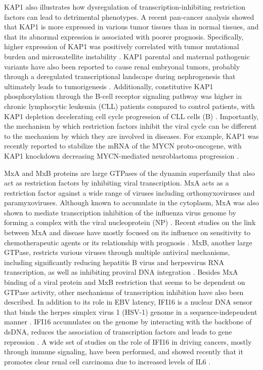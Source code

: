 \documentclass{enslyonreview}
\begin{document}
KAP1 also illustrates how dysregulation of transcription-inhibiting restriction factors can
lead to detrimental phenotypes. A recent pan-cancer analysis showed that KAP1 is more
expressed in various tumor tissues than in normal tissues, and that its abnormal expression is
associated with poorer prognosis. Specifically, higher expression of KAP1 was positively
correlated with tumor mutational burden and microsatellite instability \cite{shangSystematicPancancerAnalysis2023}. KAP1
parental and maternal pathogenic variants have also been reported to cause renal embryonal
tumors, probably through a deregulated transcriptional landscape during nephrogenesis that
ultimately leads to tumorigenesis \cite{whitworthWilmsTumourResulting2024}. Additionally, constitutive KAP1
phosphorylation through the B-cell receptor signaling pathway was higher in chronic
lymphocytic leukemia (CLL) patients compared to control patients, with KAP1 depletion
decelerating cell cycle progression of CLL cells (B) \cite{wuPhosphoproteomicsRevealsRole2022}.
Importantly, the mechanism by which restriction factors inhibit the viral cycle can be
different to the mechanism by which they are involved in diseases. For example, KAP1 was
recently reported to stabilize the mRNA of the MYCN proto-oncogene, with KAP1 knockdown
decreasing MYCN-mediated neuroblastoma progression \cite{yangKAP1StabilizesMYCN2024}.

MxA and MxB proteins are large GTPases of the dynamin superfamily that also act as restriction
factors by inhibiting viral transcription. MxA acts as a restriction factor against a wide
range of viruses including orthomyxoviruses and paramyxoviruses. Although known to accumulate
in the cytoplasm, MxA was also shown to mediate transcription inhibition of the influenza
virus genome by forming a complex with the viral nucleoprotein (NP) \cite{turanNuclearMxAProteins2004}. Recent
studies on the link between MxA and disease have mostly focused on its influence on
sensitivity to chemotherapeutic agents or its relationship with prognosis
\cite{hayesExpressionMxAEsophageal2024,liExpressionMxAProtein2020}. MxB, another large GTPase, restricts various viruses through multiple
antiviral mechanisms, including significantly reducing hepatitis B virus and herpesvirus RNA
transcription, as well as inhibiting proviral DNA integration
\cite{xieMxBImpedesNUP358mediated2020,wangInterferoninducibleMX2Host2020,schillingHumanMxBProtein2018}. Besides MxA binding of a viral protein and MxB
restriction that seems to be dependent on GTPase activity, other mechanisms of transcription
inhibition have also been described. In addition to its role in EBV latency, IFI16 is a
nuclear DNA sensor that binds the herpes simplex virus 1 (HSV-1) genome in a
sequence-independent manner \cite{howardNuclearDNASensor2022}. IFI16 accumulates on the genome by interacting
with the backbone of dsDNA, reduces the association of transcription factors and leads to
gene repression \cite{johnsonIFI16RestrictsHSV12014}. A wide set of studies on the role of IFI16 in driving
cancers, mostly through immune signaling, have been performed, and showed recently that it
promotes clear renal cell carcinoma due to increased levels of IL6 \cite{luIFI16PromotesProgression2024}.
\end{document}

